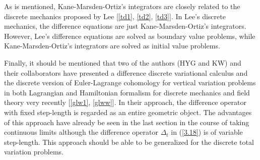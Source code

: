 \documentclass[a4paper,a4paper]{article}
\begin{document}
As is mentioned, Kane-Marsden-Ortiz's integrators are closely
related to the discrete mechanics proposed by Lee [\ref{td1},
\ref{td2}, \ref{td3}]. %
In Lee's discrete mechanics, the difference equations are just
Kane-Marsden-Ortiz's integrators.
 However, Lee's difference equations are solved as
boundary value problems, while Kane-Marsden-Ortiz's integrators
are solved as initial value problems.

Finally, it should be mentioned that two of the authors (HYG and
KW) and their collaborators have presented a difference discrete
variational calculus and the discrete version of Euler-Lagrange
cohomology  for vertical variation problems in both Lagrangian and
Hamiltonian formalism for discrete mechanics and field theory very
recently [\ref{glw1}, \ref{glww}]. In their approach, the
difference operator with fixed step-length  is regarded as an
entire geometric object. The advantages of this approach have
already be seen in the last section in the course of taking
continuous limits although the difference operator $\Delta_t$ in
(\ref{3.18}) is of variable step-length. This approach should be
able to be generalized for the  discrete total variation problems.


\end{document}
